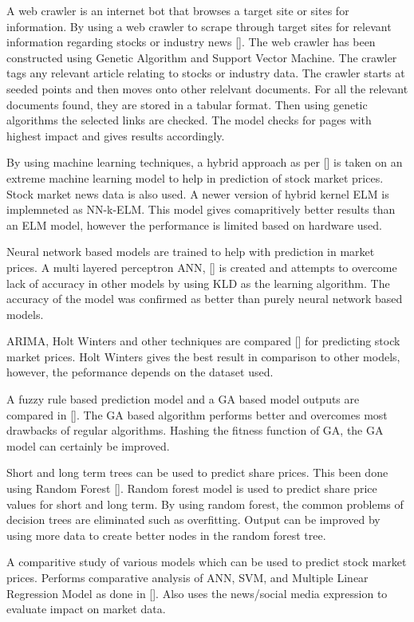 \documentclass[BTech]{srmuthesis}
\begin{document}
A web crawler is an internet bot that browses a target site or sites for information. By using a web crawler to scrape through target sites for relevant information regarding stocks or industry news []. The web crawler has been constructed using Genetic Algorithm and Support Vector Machine. The crawler tags any relevant article relating to stocks or industry data. The crawler starts at seeded points and then moves onto other relelvant documents. For all the relevant documents found, they are stored in a tabular format. Then using genetic algorithms the selected links are checked. The model checks for pages with highest impact and gives results accordingly.

By using machine learning techniques, a hybrid approach as per [] is taken on an extreme machine learning model to help in prediction of stock market prices. Stock market news data is also used. A newer version of hybrid kernel ELM is implemneted as NN-k-ELM. This model gives comapritively better results than an ELM model, however the performance is limited based on hardware used.

Neural network based models are trained to help with prediction in market prices. A multi layered perceptron \ac{ANN}, [] is created and attempts to overcome lack of accuracy in other models by using \ac{KLD} as the learning algorithm. The accuracy of the model was confirmed as better than purely neural network based models.

\ac{ARIMA}, Holt Winters and other techniques are compared [] for predicting stock market prices. Holt Winters gives the best result in comparison to other models, however, the peformance depends on the dataset used.

A fuzzy rule based prediction model and a \ac{GA} based model outputs are compared in []. The GA based algorithm performs better and overcomes most drawbacks of regular algorithms. Hashing the fitness function of GA, the GA model can certainly be improved.

Short and long term trees can be used to predict share prices. This been done using Random Forest []. Random forest model is used to predict share price values for short and long term. By using random forest, the common problems of decision trees are eliminated such as overfitting. Output can be improved by using more data to create better nodes in the random forest tree.

A comparitive study of various models which can be used to predict stock market prices. Performs comparative analysis of ANN, SVM, and Multiple Linear Regression Model as done in []. Also uses the news/social media expression to evaluate impact on market data.
\end{document}
